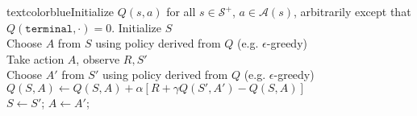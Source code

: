\documentclass{standalone}
\begin{document}
\pagestyle{empty}
\begin{algorithm}[H]
  textcolor{blue}{Initialize $Q(s,a)$ for all $s \in \mathcal S^+$, $a \in \mathcal A(s)$,   arbitrarily except that $Q(\texttt{terminal}, \cdot) = 0$.}
 {
  Initialize $S$ \\
  Choose $A$ from $S$ using policy derived from $Q$ (e.g. $\epsilon$-greedy) \\
   {
    Take action $A$, observe $R, S'$ \\
    Choose $A'$ from $S'$ using policy derived from $Q$ (e.g. $\epsilon$-greedy)         \\
    $Q(S, A) \gets Q(S, A) + \alpha \left[R + \gamma Q(S', A') - Q(S, A)\right]$     \\
    $S \gets S'$; $A \gets A'$;
  }
}
\end{algorithm}
\end{document}
